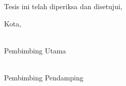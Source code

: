 \begin{center}
Tesis ini telah diperiksa dan disetujui,

\vspace{0.5cm}

{Kota}, \makebox[4cm]{\dotfill}  %
\end{center}

\vspace{3cm}


\noindent
\begin{minipage}[t]{0.49\textwidth}
\centering
{\footnotesize \underline{\SupervisorOne}}\\
{\footnotesize Pembimbing Utama}
\end{minipage}%
\hfill
\begin{minipage}[t]{0.49\textwidth}
\centering
{\footnotesize \underline{\SupervisorTwo}}\\
{\footnotesize Pembimbing Pendamping}
\end{minipage}

